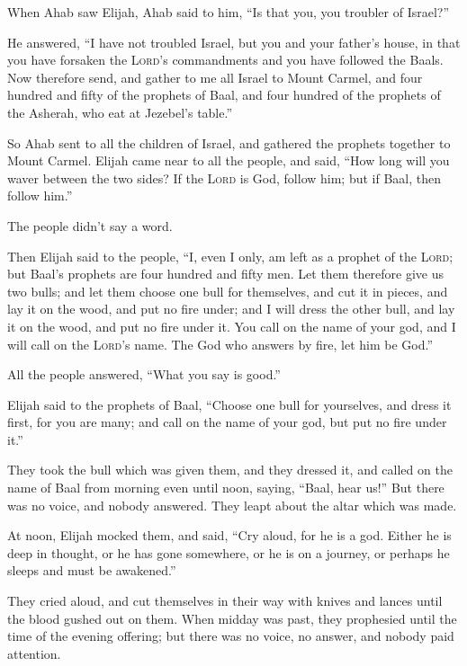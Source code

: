  When Ahab saw Elijah, Ahab said to him, ``Is that you,
you troubler of Israel?''

 He answered, ``I have not troubled Israel, but you and
your father's house, in that you have forsaken the \textsc{Lord}'s
commandments and you have followed the Baals.  Now
therefore send, and gather to me all Israel to Mount Carmel, and four
hundred and fifty of the prophets of Baal, and four hundred of the
prophets of the Asherah, who eat at Jezebel's table.''

 So Ahab sent to all the children of Israel, and gathered
the prophets together to Mount Carmel.  Elijah came near
to all the people, and said, ``How long will you waver between the two
sides? If the \textsc{Lord} is God, follow him; but if Baal, then follow
him.''

The people didn't say a word.

 Then Elijah said to the people, ``I, even I only, am
left as a prophet of the \textsc{Lord}; but Baal's prophets are four
hundred and fifty men.  Let them therefore give us two
bulls; and let them choose one bull for themselves, and cut it in
pieces, and lay it on the wood, and put no fire under; and I will dress
the other bull, and lay it on the wood, and put no fire under it.
 You call on the name of your god, and I will call on the
\textsc{Lord}'s name. The God who answers by fire, let him be God.''

All the people answered, ``What you say is good.''

 Elijah said to the prophets of Baal, ``Choose one bull
for yourselves, and dress it first, for you are many; and call on the
name of your god, but put no fire under it.''

 They took the bull which was given them, and they
dressed it, and called on the name of Baal from morning even until noon,
saying, ``Baal, hear us!'' But there was no voice, and nobody answered.
They leapt about the altar which was made.

 At noon, Elijah mocked them, and said, ``Cry aloud, for
he is a god. Either he is deep in thought, or he has gone somewhere, or
he is on a journey, or perhaps he sleeps and must be awakened.''

 They cried aloud, and cut themselves in their way with
knives and lances until the blood gushed out on them. 
When midday was past, they prophesied until the time of the evening
offering; but there was no voice, no answer, and nobody paid attention.

